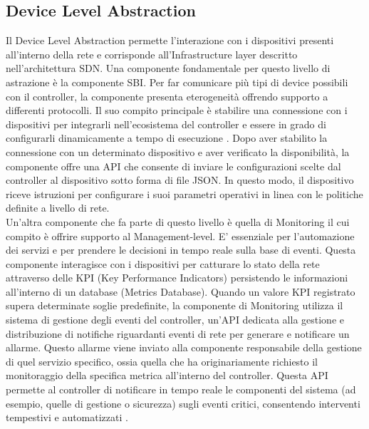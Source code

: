 \subsection{Device Level Abstraction}
Il Device Level Abstraction permette l'interazione con i dispositivi presenti all'interno della rete e corrisponde all'Infrastructure layer descritto nell'architettura SDN.
Una componente fondamentale per questo livello di astrazione è la componente SBI.
Per far comunicare più tipi di device possibili con il controller, la componente presenta eterogeneità offrendo supporto a differenti protocolli.
Il suo compito principale è stabilire una connessione con i dispositivi per integrarli nell'ecosistema del controller
e essere in grado di configurarli dinamicamente a tempo di esecuzione \cite{D32}. 
Dopo aver stabilito la connessione con un determinato dispositivo e aver verificato la disponibilità,
la componente offre una API che consente di inviare le configurazioni scelte dal controller al dispositivo sotto forma di file JSON.
In questo modo, il dispositivo riceve istruzioni per configurare i suoi parametri operativi in linea con le politiche definite a livello di rete. 
\\Un'altra componente che fa parte di questo livello è quella di Monitoring il cui compito è offrire supporto al Management-level.
E' essenziale per l'automazione dei servizi e per prendere le decisioni in tempo reale sulla base di eventi.
Questa componente interagisce con i dispositivi per catturare lo stato della rete attraverso delle KPI (Key Performance Indicators) persistendo le informazioni all'interno di un database (Metrics Database). %
Quando un valore KPI registrato supera determinate soglie predefinite, la componente di Monitoring utilizza il sistema di gestione degli eventi del controller, un'API dedicata alla gestione e distribuzione di notifiche riguardanti eventi di rete
per generare e notificare un allarme. Questo allarme viene inviato alla componente responsabile della gestione di quel servizio specifico, ossia quella che ha
originariamente richiesto il monitoraggio della specifica metrica all'interno del controller.
Questa API permette al controller di notificare in tempo reale le componenti del sistema (ad esempio, quelle di gestione o sicurezza) sugli eventi critici, consentendo interventi tempestivi e automatizzati \cite{D32}.
